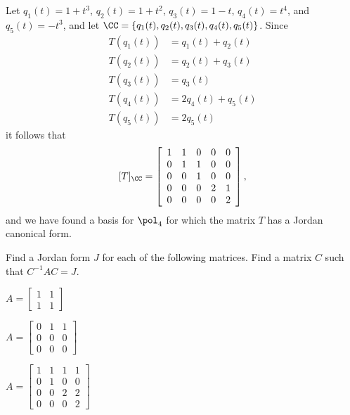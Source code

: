 \begin{example}
Let $q_1(t) = 1+t^3$, $q_2(t) = 1+t^2$, $q_3(t) = 1-t$, $q_4(t) = t^4$, and $q_5(t) = -t^3$, and let $\CC = \{q_1(t), q_2(t), q_3(t), q_4(t), q_5(t)\}$. Since  
\begin{align*}
T(q_1(t)) &= q_1(t)+q_2(t) \\
T(q_2(t)) &= q_2(t)+q_3(t) \\
T(q_3(t)) &= q_3(t) \\
T(q_4(t)) &= 2q_4(t)+q_5(t) \\
T(q_5(t)) &= 2q_5(t) 
\end{align*}
it follows that 
\[[T]_{\CC} = \left[ \begin{array}{ccccc} 1&1&0&0&0 \\ 0&1&1&0&0 \\ 0&0&1&0&0 \\ 0&0&0&2&1 \\ 0&0&0&0&2 \end{array} \right],\]
and we have found a basis for $\pol_4$ for which the matrix $T$ has a Jordan canonical form. 
\end{example}


\label{sec:jordan_exam}

\ExampleIntro

\begin{example} Find a Jordan form $J$ for each of the following matrices. Find a matrix $C$ such that $C^{-1}AC = J$. 
\ba
\begin{minipage}{2in} \item $A = \left[ \begin{array}{cc} 1&1\\1&1 \end{array} \right]$ \end{minipage} \begin{minipage}{2in}\item $A = \left[ \begin{array}{ccc} 0&1&1\\0&0&0 \\ 0&0&0 \end{array} \right]$ \end{minipage} \begin{minipage}{2in} \item $A = \left[ \begin{array}{cccc} 1&1&1&1\\0&1&0&0\\0&0&2&2 \\ 0&0&0&2 \end{array} \right]$ \end{minipage}
\ea

\ExampleSolution

\end{example}

